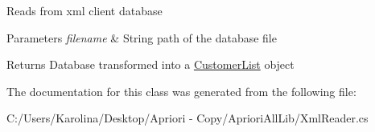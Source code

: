 Reads from xml client database 


\begin{DoxyParams}{Parameters}
{\em filename} & String path of the database file\\
\hline
\end{DoxyParams}
\begin{DoxyReturn}{Returns}
Database transformed into a \hyperlink{class_apriori_all_lib_1_1_customer_list}{Customer\-List} object
\end{DoxyReturn}


The documentation for this class was generated from the following file\-:\begin{DoxyCompactItemize}
\item 
C\-:/\-Users/\-Karolina/\-Desktop/\-Apriori -\/ Copy/\-Apriori\-All\-Lib/Xml\-Reader.\-cs\end{DoxyCompactItemize}

